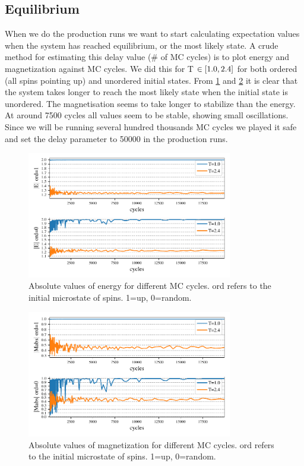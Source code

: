 \subsection{Equilibrium}

When we do the production runs we want to start calculating expectation values
when the system has reached equilibrium, or the most likely state. A crude
method for estimating this delay value (\# of MC cycles) is to plot energy and
magnetization against MC cycles. We did this for T $\in \left[1.0,2.4\right]$ for both
ordered (all spins pointing up) and unordered initial states. From
\cref{fig:equi_E} and \cref{fig:equi_M} it is clear that the system takes longer
to reach the most likely state when the initial state is unordered. The
magnetisation seems to take longer to stabilize than the energy. At around 7500
cycles all values seem to be stable, showing small oscillations. Since we will
be running several hundred thousands MC cycles we played it safe and set the
delay parameter to 50000 in the production runs.

\begin{figure}[H]
  \centering
  \includegraphics[width=0.8\textwidth]{../figures/equilibrium_E.pdf}
  \caption{Absolute values of energy for different MC cycles.
  ord refers to the initial microstate of spins. 1=up, 0=random.}
  \label{fig:equi_E}
\end{figure}


\begin{figure}[H]
  \centering
  \includegraphics[width=0.8\textwidth]{../figures/equilibrium_Mabs.pdf}
  \caption{Absolute values of magnetization for different MC cycles.
  ord refers to the initial microstate of spins. 1=up, 0=random.}
  \label{fig:equi_M}
\end{figure}




